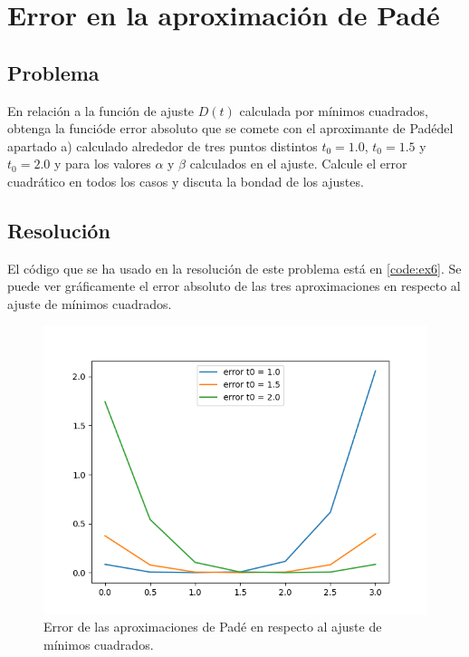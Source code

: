 \section{Error en la aproximación de Padé}

\subsection{Problema}
En relación a la función de ajuste $D(t)$ calculada por mínimos cuadrados, obtenga la funcióde error absoluto que se comete con el aproximante de Padédel apartado a) calculado alrededor de tres puntos distintos $t_0 = 1.0$, $t_0 = 1.5$ y $t_0 = 2.0$ y para los valores $\alpha$ y $\beta$ calculados en el ajuste. Calcule el error cuadrático en todos los casos y discuta la bondad de los ajustes.


\subsection{Resolución}

El código que se ha usado en la resolución de este problema está en \ref{code:ex6}. Se puede ver gráficamente el error absoluto de las tres aproximaciones en respecto al ajuste de mínimos cuadrados.

\begin{figure}[H]
	\includegraphics[width=\linewidth]{figures/error_abs_pade.png}
	\caption{Error de las aproximaciones de Padé en respecto al ajuste de mínimos cuadrados.}
	\label{fig:error_abs_pade}
\end{figure}
